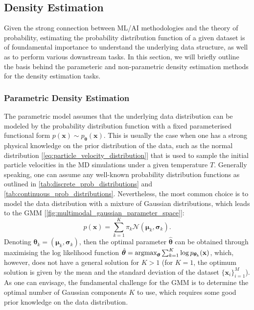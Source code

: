 \subsection{Density Estimation}
\label{appendix:density_estimation}

Given the strong connection between ML/AI methodologies and the theory of probability, estimating the probability distribution function  of a given dataset is of foundamental importance to understand the underlying data structure, as well as to perform various downstream tasks. In this section, we will briefly outline the basis behind the parameteric and non-parametric density estimation methods for the density estimation tasks.

\subsubsection{Parametric Density Estimation}
\label{appendix:parametric_density_estimation}

The parametric model assumes that the underlying data distribution can be modeled by the probability distribution function with a fixed parameterised functional form $p(\bm{x})\sim p_{\boldsymbol{\theta}}(\bm{x})$. This is usually the case when one has a strong physical knowledge on the prior distribution of the data, such as the normal distribution [\cref{eq:particle_velocity_distribution}] that is used to sample the initial particle velocities in the MD simulations under a given temperature $T$. Generally speaking, one can assume any well-known probability distribution functions as outlined in \cref{tab:discrete_prob_distributions} and \cref{tab:continuous_prob_distributions}. Nevertheless, the most common choice is to model the data distribution with a mixture of Gaussian distributions, which leads to the GMM [\cref{fig:multimodal_gaussian_parameter_space}]:
\begin{equation}
  \label{eq:GMM_density_estimate}
  p(\bm{x})=\sum_{k=1}^{K}\pi_k \mathcal{N}(\boldsymbol{\mu}_k,\boldsymbol{\sigma}_k).
\end{equation}
Denoting $\boldsymbol{\theta}_k=(\boldsymbol{\mu}_k,\boldsymbol{\sigma}_k)$, then the optimal parameter $\hat{\boldsymbol{\theta}}$ can be obtained through maximising the log likelihood function $\hat{\boldsymbol{\theta}}=\operatorname*{argmax}_{\boldsymbol{\theta}}\sum_{k=1}^{K}\log p_{\boldsymbol{\theta}_k}(\mathbf{x})$, which, however, does not have a general solution for $K>1$ (for $K=1$, the optimum solution is given by the mean and the standard deviation of the dataset $\{\bm{x}_i\}_{i=1}^{M}$). As one can envisage, the fundamental challenge for the GMM is to determine the optimal number of Gaussian components $K$ to use, which requires some good prior knowledge on the data distribution.

